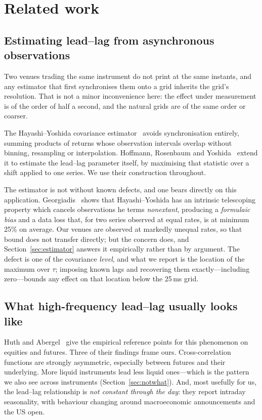 \documentclass[11pt,a4paper]{article}
\begin{document}
\section{Related work}
\label{sec:related}

\subsection{Estimating lead--lag from asynchronous observations}

Two venues trading the same instrument do not print at the same instants, and any estimator that
first synchronises them onto a grid inherits the grid's resolution. That is not a minor
inconvenience here: the effect under measurement is of the order of half a second, and the natural
grids are of the same order or coarser.

The Hayashi--Yoshida covariance estimator~\cite{hy2005} avoids synchronisation entirely, summing
products of returns whose observation intervals overlap without binning, resampling or
interpolation. Hoffmann, Rosenbaum and Yoshida~\cite{hry2013} extend it to estimate the lead--lag
parameter itself, by maximising that statistic over a shift applied to one series. We use their
construction throughout.

The estimator is not without known defects, and one bears directly on this application.
Georgiadis~\cite{georgiadis2024} shows that Hayashi--Yoshida has an intrinsic telescoping property
which cancels observations he terms \emph{nonextant}, producing a \emph{formulaic bias} and a data
loss that, for two series observed at equal rates, is at minimum 25\% on average. Our venues are
observed at markedly unequal rates, so that bound does not transfer directly; but the concern
does, and Section~\ref{sec:estimator} answers it empirically rather than by argument. The defect
is one of the covariance \emph{level}, and what we report is the location of the maximum over
$\tau$; imposing known lags and recovering them exactly---including zero---bounds any effect on
that location below the 25\,ms grid.

\subsection{What high-frequency lead--lag usually looks like}

Huth and Abergel~\cite{huth2014} give the empirical reference points for this phenomenon on
equities and futures. Three of their findings frame ours. Cross-correlation functions are
strongly asymmetric, especially between futures and their underlying. More liquid instruments
lead less liquid ones---which is the pattern we also see across instruments
(Section~\ref{sec:notwhat}). And, most usefully for us, the lead--lag relationship is
\emph{not constant through the day}: they report intraday seasonality, with behaviour changing
around macroeconomic announcements and the US open.
\end{document}
